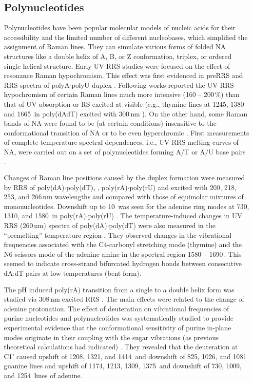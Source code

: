 \subsection{Polynucleotides}

Polynucleotides have been popular molecular models of nucleic acids for their
accessibility and the limited number of different nucleobases, which simplified
the assignment of Raman lines.
They can simulate various forms of folded NA structures like a double
helix of A, B, or Z conformation, triplex, or ordered single-helical structure.
Early UV RRS studies were focused on the effect of resonance Raman
hypochromism.
This effect was first evidenced in preRRS and RRS spectra of polyA$\cdot$polyU
duplex
\parencite{Pezolet1975}.
Following works reported the UV RRS hypochromism of certain Raman lines much
more intensive (160 -- 200\,\%) than that of UV absorption or RS excited at
visible (e.g., thymine lines at 1245, 1380 and 1665\,\icm{} in poly(dAdT)
excited with 300\,nm
\cite{Chinsky1982a}).
On the other hand, some Raman bands of NA were found to be (at certain
conditions) insensitive to the conformational transition of NA or to be even
hyperchromic
\parencite{Chinsky1980}.
First measurements of complete temperature spectral dependences, i.e., UV RRS
melting curves of NA, were carried out on a set of polynucleotides forming A/T
or A/U base pairs
\parencite{Jolles1985}.

Changes of Raman line positions caused by the duplex formation were measured by
RRS of
	poly(dA)$\cdot$poly(dT),
	,
	poly(rA)$\cdot$poly(rU)
	and 
excited with 200, 218, 253, and 266\,nm wavelengths and compared with those of
equimolar mixtures of mononucleotides.
Downshift up to 10\,\icm{} was seen for the adenine ring modes at 730, 1310,
and 1580\,\icm{} in poly(rA)$\cdot$poly(rU)
\parencite{Grygon1990}.
The temperature-induced changes in UV RRS (260\,nm) spectra of
poly(dA)$\cdot$poly(dT) were also measured in the “premelting” temperature
region
\parencite{Chan1997}.
They observed changes in the vibrational frequencies associated with the
C4-carbonyl stretching mode (thymine) and the N6 scissors mode of the adenine
amine in the spectral region 1580 -- 1690\,\icm{}.
This seemed to indicate cross-strand bifurcated hydrogen bonds between
consecutive dA:dT pairs at low temperatures (bent form).

The pH induced poly(rA) transition from a single to a double helix
form was studied via 308\,nm excited RRS
\parencite{Gfrorer1989}.
The main effects were related to the change of adenine protonation.
The effect of deuteration on vibrational frequencies of purine nucleotides and
polynucleotides was systematically studied to provide experimental
evidence that the conformational sensitivity of purine in-plane modes originate
in their coupling with the sugar vibrations (as previous theoretical
calculations had indicated)
\parencite{Toyama1993}.
They revealed that the deuteration at C1' caused upshift of 1208, 1321, and
1414\,\icm{} and downshift of 825, 1026, and 1081\,\icm{} guanine lines and
upshift of 1174, 1213, 1309, 1375\,\icm{} and downshift of 730, 1009, and
1254\,\icm{} lines of adenine.

